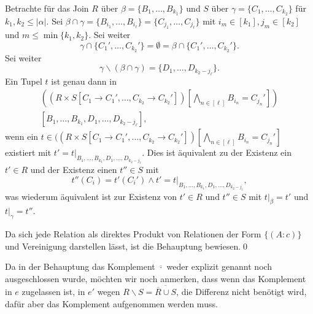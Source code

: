 \documentclass[12pt,a4paper]{amsart}
\begin{document}
Betrachte für das Join $R$ über $\beta=\{B_1,\dots,B_{k_1}\}$ und $S$ über $\gamma=\{C_1,\dots,C_{k_2}\}$ für $k_1,k_2\leq|\alpha|$. Sei $\beta\cap\gamma=\{B_{i_1},\dots,B_{i_{\ell}}\}=\{C_{j_1},\dots,C_{j_{\ell}}\}$ mit $i_m\in[k_1],j_m\in[k_2]$ und $m\leq\min\{k_1,k_2\}$. Sei weiter 
\[
\gamma\cap\{C_1',\dots,C_{k_2}'\}=\emptyset=\beta\cap\{C_1',\dots,C_{k_2}'\}.
\]
Sei weiter 
\[
\gamma\backslash(\beta\cap\gamma)=\{D_1,\dots,D_{k_2-j_{\ell}}\}.
\]
Ein Tupel $t$ ist genau
dann in 
\begin{multline*}
((R\times S[C_1\rightarrow C_1',\dots,C_{k_2}\rightarrow C_{k_2}'])[\bigwedge_{n\in[\ell]}B_{i_n}=C_{j_n}'])\\
[B_1,\dots,B_{k_1},D_1,\dots,D_{k_2-j_{\ell}}],
\end{multline*}
wenn ein $t\in((R\times S[C_1\rightarrow C_1',\dots,C_{k_2}\rightarrow C_{k_2}'])[\bigwedge_{n\in[\ell]}B_{i_n}=C_{j_n}']$ existiert mit $t'=t|_{B_1,\dots,B_{k_1},D_1,\dots,D_{k_2-j_{\ell}}}$. Dies ist äquivalent zu der Existenz ein $t'\in R$ und der Existenz einen $t''\in S$ mit 
\[
t''(C_i)=t'(C_i')\land t'=t|_{B_1,\dots,B_{k_1},D_1,\dots,D_{k_2-j_{\ell}}},
\]
was wiederum äquivalent ist zur Existenz von $t'\in R$ und $t''\in S$ mit $t|_{\beta}=t'$ und $t|_{\gamma}=t''$.

\medskip

Da sich jede Relation als direktes Produkt von Relationen der Form $\{(A:c)\}$ und Vereinigung darstellen lässt, ist die Behauptung bewiesen.\qed

\bigskip

Da in der Behauptung das Komplement $\overline{\cdot}$ weder explizit genannt noch ausgeschlossen wurde, möchten wir noch anmerken, dass wenn das Komplement in $e$ zugelassen ist, in $e'$ wegen $R\backslash S=\overline{\overline{R}\cup S}$, die Differenz nicht benötigt wird, dafür aber das Komplement aufgenommen werden muss.
\end{document}
